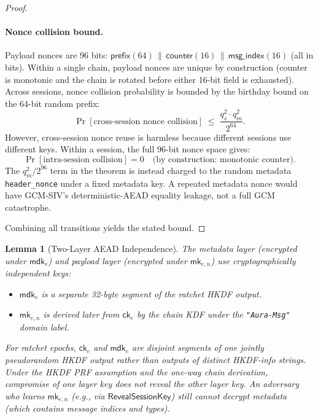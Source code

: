 \documentclass[11pt,a4paper]{article}
\newtheorem{lemma}[theorem]{Lemma}
\theoremstyle{definition}
\theoremstyle{remark}
\newcommand{\ck}{\mathsf{ck}}
\newcommand{\mk}{\mathsf{mk}}
\newcommand{\mdk}{\mathsf{mdk}}
\newcommand{\concat}{\,\|\,}
\begin{document}
\begin{proof}
\paragraph{Nonce collision bound.}
Payload nonces are 96 bits: $\mathsf{prefix}(64) \concat
\mathsf{counter}(16) \concat \mathsf{msg\_index}(16)$ (all in bits).
Within a single chain, payload nonces are unique by construction (counter is
monotonic and the chain is rotated before either 16-bit field is exhausted).
Across sessions, nonce collision probability is bounded by the birthday bound
on the 64-bit random prefix:
\[
  \Pr[\text{cross-session nonce collision}] \;\leq\; \frac{q_s^2 \cdot q_m^2}{2^{64}}.
\]
However, cross-session nonce reuse is harmless because different sessions
use different keys.  Within a session, the full 96-bit nonce space gives:
\[
  \Pr[\text{intra-session collision}] = 0 \quad\text{(by construction: monotonic counter)}.
\]
The $q_m^2 / 2^{96}$ term in the theorem is instead charged to the random
metadata \texttt{header\_nonce} under a fixed metadata key. A repeated metadata
nonce would have GCM-SIV's deterministic-AEAD equality leakage, not a full GCM
catastrophe.

Combining all transitions yields the stated bound. \qedhere
\end{proof}

\begin{lemma}[Two-Layer AEAD Independence]
\label{lem:two-layer}
The metadata layer (encrypted under $\mdk_e$) and payload layer (encrypted
under $\mk_{e,n}$) use cryptographically independent keys:
\begin{itemize}[nosep]
  \item $\mdk_e$ is a separate 32-byte segment of the ratchet HKDF output.
  \item $\mk_{e,n}$ is derived later from $\ck_e$ by the chain KDF under the
        \texttt{"Aura-Msg"} domain label.
\end{itemize}
For ratchet epochs, $\ck_e$ and $\mdk_e$ are disjoint segments of one jointly
pseudorandom HKDF output rather than outputs of distinct HKDF-info strings.
Under the HKDF PRF assumption and the one-way chain derivation, compromise of
one layer key does not reveal the other layer key.
An adversary who learns $\mk_{e,n}$ (e.g., via $\mathsf{RevealSessionKey}$)
still cannot decrypt metadata (which contains message indices and types).
\end{lemma}
\end{document}
